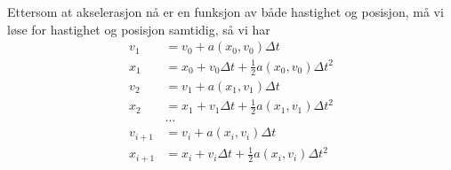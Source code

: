 \documentclass[a4paper, 11pt, notitlepage, english]{article}
\begin{document}
Ettersom at akselerasjon nå er en funksjon av både hastighet og posisjon, må vi løse for hastighet og posisjon samtidig, så vi har
\begin{align*}
v_1 &= v_0 + a(x_0, v_0)\Delta t \\
x_1 &= x_0 + v_0\Delta t + \frac{1}{2}a(x_0, v_0)\Delta t^2 \\
v_2 &= v_1 + a(x_1, v_1)\Delta t \\
x_2 &= x_1 + v_1\Delta t + \frac{1}{2}a(x_1, v_1)\Delta t^2 \\
&\hdots \\
v_{i+1} &= v_i + a(x_i, v_i)\Delta t \\
x_{i+1} &= x_i + v_i\Delta t + \frac{1}{2}a(x_i, v_i)\Delta t^2 \\
\end{align*}

\clearpage
\end{document}
